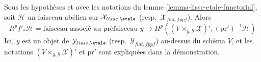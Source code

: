 \begin{lemma}
\label{lemma-lisse-etale-functorial-pushforward}
Sous les hypothèses et avec les notations du lemme
\ref{lemma-lisse-etale-functorial}, soit $\mathcal{H}$ un faisceau abélien sur
$\mathcal{X}_{lisse,\etale}$ (resp.\ $\mathcal{X}_{flat,fppf}$). Alors
\begin{equation}
\label{equation-higher-direct-image-lisse-etale}
R^pf'_*\mathcal{H} =
\text{faisceau associé au préfaisceau }y \longmapsto
H^p((V \times_{y, \mathcal{Y}} \mathcal{X})', (\text{pr}')^{-1}\mathcal{H})
\end{equation}
Ici, $y$ est un objet de $\mathcal{Y}_{lisse,\etale}$
(resp.\ $\mathcal{Y}_{flat,fppf}$) au-dessus du schéma $V$, et les notations
$(V \times_{y, \mathcal{Y}} \mathcal{X})'$ et $\text{pr}'$ sont
expliquées dans la démonstration.
\end{lemma}

